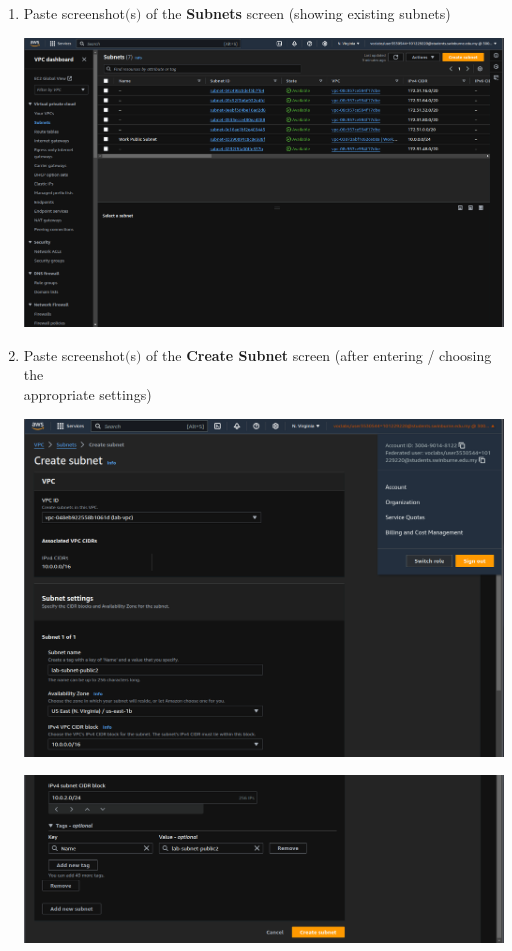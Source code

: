 \documentclass[11pt]{article}
\begin{document}
\begin{enumerate}[resume]
    \item Paste screenshot$($s$)$ of the \textbf{Subnets} screen (showing existing subnets) \\
    \vspace{5mm}

    {\centering
    \includegraphics[width=5.8in]{pics/4.png}
    }

    
    \item Paste screenshot$($s$)$ of the \textbf{Create Subnet} screen (after entering / choosing the \\ appropriate settings) \\
    \vspace{2mm}

    {\centering
    \includegraphics[width=5.8in]{pics/5_a.png}
    }

    {\centering
    \includegraphics[width=5.8in]{pics/5_b.png}
    }


\end{enumerate}
\end{document}
